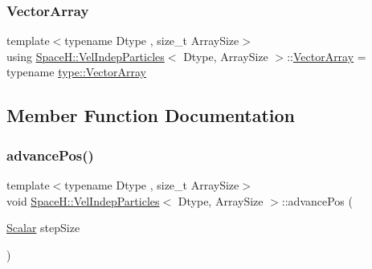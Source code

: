 \mbox{\label{class_space_h_1_1_vel_indep_particles_aa9983058940249df8b00fa800e8cbad2}} 
\subsubsection{\texorpdfstring{Vector\+Array}{VectorArray}}
{\footnotesize\ttfamily template$<$typename Dtype , size\+\_\+t Array\+Size$>$ \\
using \mbox{\hyperlink{class_space_h_1_1_vel_indep_particles}{Space\+H\+::\+Vel\+Indep\+Particles}}$<$ Dtype, Array\+Size $>$\+::\mbox{\hyperlink{class_space_h_1_1_vel_indep_particles_aa9983058940249df8b00fa800e8cbad2}{Vector\+Array}} =  typename \mbox{\hyperlink{struct_space_h_1_1_proto_type_a622b8e122b33bb4966a02299fb7b82d6}{type\+::\+Vector\+Array}}}



\subsection{Member Function Documentation}
\mbox{\label{class_space_h_1_1_vel_indep_particles_a19941153b3529267f5bfa6e7b6e2d4ff}} 
\subsubsection{\texorpdfstring{advance\+Pos()}{advancePos()}\hspace{0.1cm}{\footnotesize\ttfamily [1/2]}}
{\footnotesize\ttfamily template$<$typename Dtype , size\+\_\+t Array\+Size$>$ \\
void \mbox{\hyperlink{class_space_h_1_1_vel_indep_particles}{Space\+H\+::\+Vel\+Indep\+Particles}}$<$ Dtype, Array\+Size $>$\+::advance\+Pos (\begin{DoxyParamCaption}\item[{\mbox{\hyperlink{class_space_h_1_1_vel_indep_particles_aeb47d8131b30ed790320ff634f0d6af1}{Scalar}}}]{step\+Size }\end{DoxyParamCaption})\hspace{0.3cm}{\ttfamily [inline]}}



